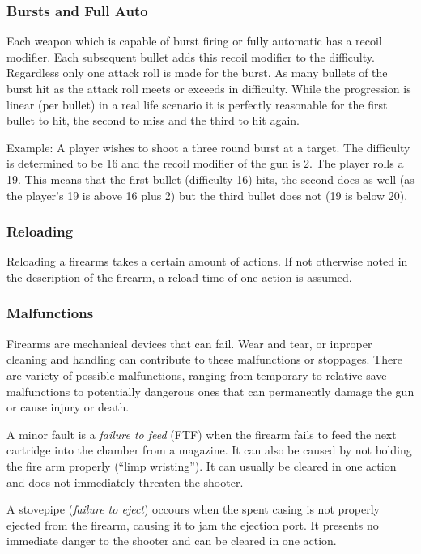 \subsubsection{Bursts and Full Auto}

Each weapon which is capable of burst firing or fully automatic has a recoil
modifier. Each subsequent bullet adds this recoil modifier to the difficulty.
Regardless only one attack roll is made for the burst. As many bullets of the
burst hit as the attack roll meets or exceeds in difficulty. While the
progression is linear (per bullet) in a real life scenario it is perfectly
reasonable for the first bullet to hit, the second to miss and the third to
hit again.

Example: A player wishes to shoot a three round burst at a target. The
difficulty is determined to be 16 and the recoil modifier of the gun is 2.
The player rolls a 19. This means that the first bullet (difficulty 16) hits,
the second does as well (as the player's 19 is above 16 plus 2) but the third
bullet does not (19 is below 20).

\subsubsection{Reloading}

Reloading a firearms takes a certain amount of actions. If not otherwise noted
in the description of the firearm, a reload time of one action is assumed.

\subsubsection{Malfunctions}

Firearms are mechanical devices that can fail. Wear and tear, or inproper
cleaning and handling can contribute to these malfunctions or stoppages. There
are variety of possible malfunctions, ranging from temporary to relative save
malfunctions to potentially dangerous ones that can permanently damage the gun
or cause injury or death.

A minor fault is a \emph{failure to feed} (FTF) when the firearm fails to feed
the next cartridge into the chamber from a magazine. It can also be caused by
not holding the fire arm properly (``limp wristing''). It can usually be cleared
in one action and does not immediately threaten the shooter.

A stovepipe (\emph{failure to eject}) occours when the spent casing is not
properly ejected from the firearm, causing it to jam the ejection port. It
presents no immediate danger to the shooter and can be cleared in one action.

